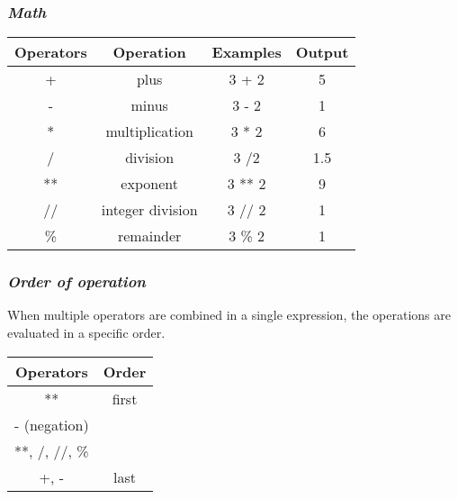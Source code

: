 \documentclass{article}
\begin{document}
{{{\subsubsection{\small\textsl{Math}}
\begin{table}[ht]
\begin{tabular}{c c c c}
Operators & Operation & Examples & Output \\
\hline
+ & plus & 3 + 2 & 5 \\
- & minus & 3 - 2 & 1 \\
\** & multiplication & 3 * 2 & 6 \\
/ & division & 3 /2 & 1.5 \\
\*** & exponent & 3 ** 2 & 9 \\
// & integer division  & 3 // 2 & 1 \\
\% & remainder & 3 \% 2 & 1 \\
\end{tabular}
\end{table}

\subsubsection{\small\textsl{Order of operation}}
When multiple operators are combined in a single expression, the operations are evaluated in a specific order.

\begin{table}[ht]
\begin{tabular}{c c}
Operators & Order\\
\hline
** & first\\
- (negation) \\
**, /, //, \% \\
+, - & last \\
\end{tabular}
\end{table}

}}}
\end{document}
